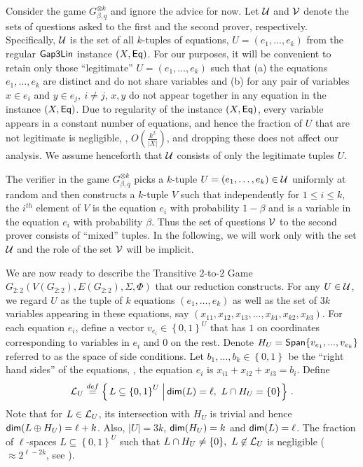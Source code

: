 \documentclass{toc}
\newcommand\sett[2]{\left\{ \left. #1 \;\right\vert #2 \right\}}
\newcommand\set[1]{{\left\{ #1 \right\}}}
\newcommand\power[1]{\set{0,1}^{#1}}
\newcommand\defeq{\stackrel{def}{=}}
\newcommand*\xor{\mathbin{\oplus}}
\renewcommand\leq{\leqslant}
\begin{document}
Consider the game $G_{\beta, q}^{\otimes k}$ and ignore the advice for now.
Let ${\cal U}$ and ${\cal V}$ denote the sets of questions asked to the first and the second prover, respectively.  %
Specifically, ${\cal U}$
is the set of all $k$-tuples of equations, $U = (e_1, \ldots, e_k)$ from the regular ${\sf Gap3Lin}$
instance $(X, {\sf Eq})$.
For our purposes, it will be convenient to retain only those ``legitimate'' $U = (e_1, \ldots, e_k)$ such that (a) the equations
 $e_1, \ldots, e_k$ are distinct and do not share variables and (b) for any pair of variables $x \in e_i$ and
 $y \in e_j, ~i\neq  j$, $x, y$ do not appear together in any equation in the instance $(X, {\sf Eq})$. Due to
 regularity of the instance $(X, {\sf Eq})$, every variable appears in a constant number of equations, and hence
 the fraction of $U$ that are not legitimate is negligible, \ie, $O(\frac{k^2}{|X|})$, and dropping these does
 not affect our analysis. We assume henceforth that ${\cal U}$ consists of only the legitimate  tuples $U$.

 The verifier in the game $G_{\beta, q}^{\otimes k}$ picks a $k$-tuple $U = (e_1,\ldots, e_k) \in {\cal U}$ uniformly at random
 and then constructs a $k$-tuple $V$ such that independently for $1 \leq i \leq k$, the $i^{th}$ element of
 $V$ is the equation $e_i$ with probability $1-\beta$ and is a variable in the equation $e_i$ with probability $\beta$.
 Thus the set of questions ${\cal V}$ to the second prover consists of ``mixed'' tuples. In the following, we will work
 only with the set ${\cal U}$ and the role of the set ${\cal V}$ will be implicit.





We are now ready to describe the Transitive $2$-to-$2$ Game $G_{2:2} ( V(G_{2:2}), E(G_{2:2}), \Sigma, \Phi)$ that our
 reduction constructs. For any $U \in {\cal U}$, we regard $U$ as the tuple of $k$ equations $(e_1,\ldots, e_k)$ as well
 as the set of $3k$ variables appearing in these equations, say $(x_{11}, x_{12}, x_{13}, \ldots, x_{k1}, x_{k2}, x_{k3})$.
For each equation $e_i$, define a vector $v_{e_i}\in \power{U}$ that has $1$ on coordinates corresponding
to variables in $e_i$ and $0$ on the rest.
Denote $H_U={\sf Span}{\set{v_{e_1},...,v_{e_k}}}$ referred to as the space of side conditions. Let $b_1, \ldots, b_k \in \power{}$
be the ``right hand sides'' of the equations, \ie, the equation $e_i$ is $x_{i1} + x_{i2} + x_{i3} = b_i$. Define
\[
{\cal L}_U\defeq \sett{L\subseteq \power{U}}{{\sf dim}(L)=\ell,  ~L \cap H_U = \{0\}}\,.%
\]
 Note that for $L \in {\cal L}_U$, its intersection with $H_U$ is trivial and hence ${\sf dim}(L \xor H_U) = \ell+k$.
 Also, $|U|=3k$, ${\sf dim}(H_U) = k$ and ${\sf dim}(L)=\ell$. The fraction of $\ell$-spaces $L \subseteq \power{U}$ such that
$L \cap H_U \neq  \{0\}, ~L \not\in {\cal L}_U$ is negligible ($\approx 2^{\ell-2k}$, see ).
\end{document}
